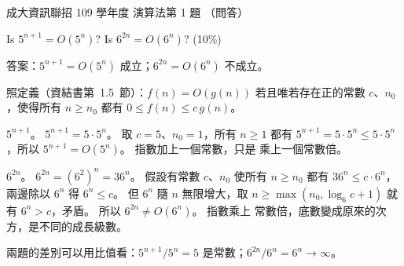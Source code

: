 \begin{pastexam}[label={px:ncku-109-prog-04}]{成大資訊聯招 109 學年度 演算法第 1 題}
（問答）

Is $5^{n+1}=O(5^n)$? Is $6^{2n}=O(6^n)$? (10\%)
\end{pastexam}

\begin{pastsoln}
答案：$5^{n+1} = O(5^n)$ 成立；$6^{2n} = O(6^n)$ 不成立。

照定義（資結書第~1.5~節）：$f(n) = O(g(n))$ 若且唯若存在正的常數 $c$、$n_0$，使得所有
$n \ge n_0$ 都有 $0 \le f(n) \le c\,g(n)$。

\textbf{$5^{n+1}$}。 $5^{n+1} = 5 \cdot 5^n$。 取 $c = 5$、$n_0 = 1$，所有 $n \ge 1$ 都有
$5^{n+1} = 5 \cdot 5^n \le 5 \cdot 5^n$，所以 $5^{n+1} = O(5^n)$。 指數加上一個常數，只是
乘上一個常數倍。

\textbf{$6^{2n}$}。 $6^{2n} = (6^2)^n = 36^n$。 假設有常數 $c$、$n_0$ 使所有 $n \ge n_0$ 都有
$36^n \le c \cdot 6^n$，兩邊除以 $6^n$ 得 $6^n \le c$。 但 $6^n$ 隨 $n$ 無限增大，取
$n \ge \max(n_0, \log_6 c + 1)$ 就有 $6^n > c$，矛盾。 所以 $6^{2n} \ne O(6^n)$。 指數乘上
常數倍，底數變成原來的次方，是不同的成長級數。

兩題的差別可以用比值看：$5^{n+1}/5^n = 5$ 是常數；$6^{2n}/6^n = 6^n \to \infty$。
\end{pastsoln}
